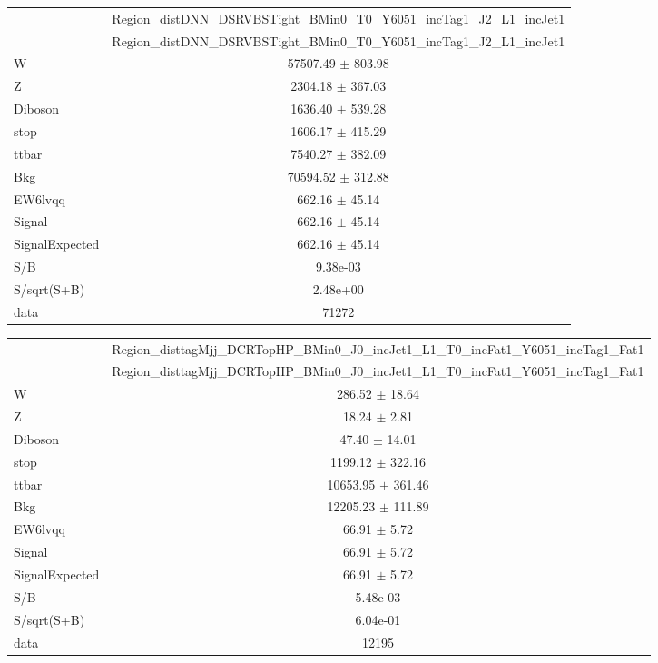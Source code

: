 \documentclass{article}
\begin{document}
\begin{table}
\centering
\small
\begin{tabular}{l|c|}
\cline{2-2}
 & \multicolumn{1}{c|}{Region\_distDNN\_DSRVBSTight\_BMin0\_T0\_Y6051\_incTag1\_J2\_L1\_incJet1}\\
\cline{2-2}
 & \multicolumn{1}{c|}{Region\_distDNN\_DSRVBSTight\_BMin0\_T0\_Y6051\_incTag1\_J2\_L1\_incJet1}\\ \hline
W & 57507.49 $\pm$ 803.98\\
Z & 2304.18 $\pm$ 367.03\\
Diboson & 1636.40 $\pm$ 539.28\\
stop & 1606.17 $\pm$ 415.29\\
ttbar & 7540.27 $\pm$ 382.09\\
\hline
Bkg & 70594.52 $\pm$ 312.88\\
\hline
EW6lvqq & 662.16 $\pm$ 45.14\\
\hline
Signal & 662.16 $\pm$ 45.14\\
SignalExpected & 662.16 $\pm$ 45.14\\
\hline
S/B & 9.38e-03\\
S/sqrt(S+B) & 2.48e+00\\
\hline
data & 71272\\ \hline
\end{tabular}
\end{table}


\begin{table}
\centering
\small
\begin{tabular}{l|c|}
\cline{2-2}
 & \multicolumn{1}{c|}{Region\_disttagMjj\_DCRTopHP\_BMin0\_J0\_incJet1\_L1\_T0\_incFat1\_Y6051\_incTag1\_Fat1}\\
\cline{2-2}
 & \multicolumn{1}{c|}{Region\_disttagMjj\_DCRTopHP\_BMin0\_J0\_incJet1\_L1\_T0\_incFat1\_Y6051\_incTag1\_Fat1}\\ \hline
W & 286.52 $\pm$ 18.64\\
Z & 18.24 $\pm$ 2.81\\
Diboson & 47.40 $\pm$ 14.01\\
stop & 1199.12 $\pm$ 322.16\\
ttbar & 10653.95 $\pm$ 361.46\\
\hline
Bkg & 12205.23 $\pm$ 111.89\\
\hline
EW6lvqq & 66.91 $\pm$ 5.72\\
\hline
Signal & 66.91 $\pm$ 5.72\\
SignalExpected & 66.91 $\pm$ 5.72\\
\hline
S/B & 5.48e-03\\
S/sqrt(S+B) & 6.04e-01\\
\hline
data & 12195\\ \hline
\end{tabular}
\end{table}
\end{document}
